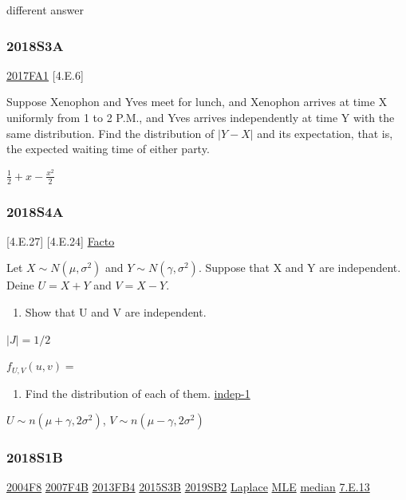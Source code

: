 \documentclass[10pt,twocolumn,portrait]{article}
\providecommand{\tightlist}{%
  \setlength{\itemsep}{0pt}\setlength{\parskip}{0pt}}
\begin{document}
{ different answer }

\hypertarget{s3a-2}{%
\subsubsection{2018S3A}\label{s3a-2}}

\protect\hyperlink{fa1-3}{2017FA1}
{[}4.E.6{]}\protect\hyperlink{section}{}

Suppose Xenophon and Yves meet for lunch, and Xenophon arrives at time X
uniformly from 1 to 2 P.M., and Yves arrives independently at time Y
with the same distribution. Find the distribution of \(|Y-X|\) and its
expectation, that is, the expected waiting time of either party.

\(\frac12+x-\frac{x^2}2\)

\hypertarget{s4a-2}{%
\subsubsection{2018S4A}\label{s4a-2}}

{[}4.E.27{]}\protect\hyperlink{section}{}
{[}4.E.24{]}\protect\hyperlink{section}{}
\protect\hyperlink{Facto}{Facto}

Let \(X\sim N(\mu,\sigma^2)\) and \(Y\sim N(\gamma,\sigma^2)\). Suppose
that X and Y are independent. Deine \(U=X+Y\) and \(V=X-Y\).

\begin{enumerate}
\def\labelenumi{(\alph{enumi})}
\tightlist
\item
  Show that U and V are independent.
\end{enumerate}

\(|J|=1/2\)

\(f_{U,V}(u,v)=\)

\begin{enumerate}
\def\labelenumi{(\alph{enumi})}
\setcounter{enumi}{1}
\tightlist
\item
  Find the distribution of each of them.
  \protect\hyperlink{indep-1}{indep-1}
\end{enumerate}

\(U\sim n(\mu+\gamma,2\sigma^2)\), \(V\sim n(\mu-\gamma,2\sigma^2)\)

\hypertarget{s1b-2}{%
\subsubsection{2018S1B}\label{s1b-2}}

\protect\hyperlink{f8-2}{2004F8} \protect\hyperlink{f4b}{2007F4B}
\protect\hyperlink{fb4-2}{2013FB4} \protect\hyperlink{s3b-1}{2015S3B}
\protect\hyperlink{sb2-3}{2019SB2} \protect\hyperlink{Laplace}{Laplace}
\protect\hyperlink{MLE}{MLE} \protect\hyperlink{median}{median}
\protect\hyperlink{e.13}{7.E.13}
\end{document}
